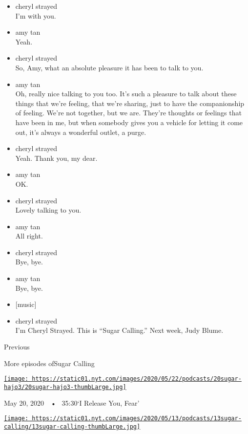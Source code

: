 \begin{itemize}
\item
  cheryl strayed\\
  I'm with you.
\item
  amy tan\\
  Yeah.
\item
  cheryl strayed\\
  So, Amy, what an absolute pleasure it has been to talk to you.
\item
  amy tan\\
  Oh, really nice talking to you too. It's such a pleasure to talk about
  these things that we're feeling, that we're sharing, just to have the
  companionship of feeling. We're not together, but we are. They're
  thoughts or feelings that have been in me, but when somebody gives you
  a vehicle for letting it come out, it's always a wonderful outlet, a
  purge.
\item
  cheryl strayed\\
  Yeah. Thank you, my dear.
\item
  amy tan\\
  OK.
\item
  cheryl strayed\\
  Lovely talking to you.
\item
  amy tan\\
  All right.
\item
  cheryl strayed\\
  Bye, bye.
\item
  amy tan\\
  Bye, bye.
\item
  {[}music{]}
\item
  cheryl strayed\\
  I'm Cheryl Strayed. This is ``Sugar Calling.'' Next week, Judy Blume.
\end{itemize}

Previous

More episodes ofSugar Calling

\href{https://www.nytimes.com/2020/05/20/podcasts/sugar-calling-joy-harjo-poetry-virus.html?action=click\&module=audio-series-bar\&region=header\&pgtype=Article}{\texttt{[image: https://static01.nyt.com/images/2020/05/22/podcasts/20sugar-hajo3/20sugar-hajo3-thumbLarge.jpg]}}

May 20, 2020~~•~ 35:30`I Release You, Fear'

\href{https://www.nytimes.com/2020/05/13/podcasts/sugar-calling-billy-collins-poetry-virus.html?action=click\&module=audio-series-bar\&region=header\&pgtype=Article}{\texttt{[image: https://static01.nyt.com/images/2020/05/13/podcasts/13sugar-calling/13sugar-calling-thumbLarge.jpg]}}

